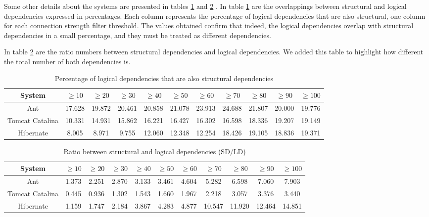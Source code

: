 \documentclass[runningheads]{comsis2}
\begin{document}
Some other details about the systems are presented in tables \ref{tab:overlap} and \ref{tab:ratio_sd_ld} . In table \ref{tab:overlap} are the overlappings between structural and logical dependencies expressed in percentages. Each column represents the percentage of logical dependencies that are also structural, one column for each connection strength filter threshold. 
The values obtained confirm that indeed, the logical dependencies overlap with structural dependencies in a small percentage, and they must be treated as different dependencies.

In table \ref{tab:ratio_sd_ld} are the ratio numbers between structural dependencies and logical dependencies. We added this table to highlight how different the total number of both dependencies is.


\begin{table}[!h]
\setlength\tabcolsep{3pt}
\caption{Percentage of logical dependencies that are also structural dependencies}
\label{tab:overlap}
\centering
\begin{tabular}{|c|cccccccccc|}
\hline
System &	$\geq10$	&	$\geq20$		&	$\geq30$		&	$\geq40$		&	$\geq50$		&	$\geq60$		&	$\geq70$		&	$\geq80$		&	$\geq90$		&	$\geq100$ \\
\hline
Ant	&	17.628	&	19.872	&	20.461	&	20.858	&	21.078	&	23.913	&	24.688	&	21.807	&	20.000	&	19.776	\\
Tomcat Catalina  	&	10.331	&	14.931	&	15.862	&	16.221	&	16.427	&	16.302	&	16.598	&	18.336	&	19.207	&	19.149	\\
Hibernate	&	8.005	&	8.971	&	9.755	&	12.060	&	12.348	&	12.254	&	18.426	&	19.105	&	18.836	&	19.371	\\
\hline
\end{tabular}
\end{table}



\begin{table}[!h]
\setlength\tabcolsep{3.5pt}
\caption{Ratio between structural and logical dependencies (SD/LD)}
\label{tab:ratio_sd_ld}
\centering
\begin{tabular}{|c|cccccccccc|}
\hline
System &	$\geq10$	&	$\geq20$		&	$\geq30$		&	$\geq40$		&	$\geq50$		&	$\geq60$		&	$\geq70$		&	$\geq80$		&	$\geq90$		&	$\geq100$ \\

\hline
Ant	&	1.373	&	2.251	&	2.870	&	3.133	&	3.461	&	4.604	&	5.282	&	6.598	&	7.060	&	7.903	\\
Tomcat Catalina	&	0.445	&	0.936	&	1.302	&	1.543	&	1.660	&	1.967	&	2.218	&	3.057	&	3.376	&	3.440	\\
Hibernate	&	1.159	&	1.747	&	2.184	&	3.867	&	4.283	&	4.877	&	10.547	&	11.920	&	12.464	&	14.851	\\

\hline
\end{tabular}
\end{table}
\end{document}

